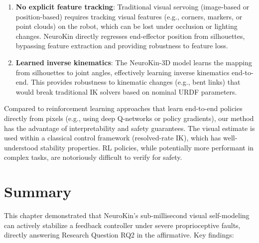 \documentclass[12pt,a4paper,oneside]{report}
\begin{document}
\begin{enumerate}
    \item \textbf{No explicit feature tracking}: Traditional visual servoing (image-based or position-based) requires tracking visual features (e.g., corners, markers, or point clouds) on the robot, which can be lost under occlusion or lighting changes. NeuroKin directly regresses end-effector position from silhouettes, bypassing feature extraction and providing robustness to feature loss.
    \item \textbf{Learned inverse kinematics}: The NeuroKin-3D model learns the mapping from silhouettes to joint angles, effectively learning inverse kinematics end-to-end. This provides robustness to kinematic changes (e.g., bent links) that would break traditional IK solvers based on nominal URDF parameters.
\end{enumerate}

Compared to reinforcement learning approaches that learn end-to-end policies directly from pixels (e.g., using deep Q-networks or policy gradients), our method has the advantage of interpretability and safety guarantees. The visual estimate is used within a classical control framework (resolved-rate IK), which has well-understood stability properties. RL policies, while potentially more performant in complex tasks, are notoriously difficult to verify for safety.

\section{Summary}

This chapter demonstrated that NeuroKin's sub-millisecond visual self-modeling can actively stabilize a feedback controller under severe proprioceptive faults, directly answering Research Question RQ2 in the affirmative. Key findings:
\end{document}
